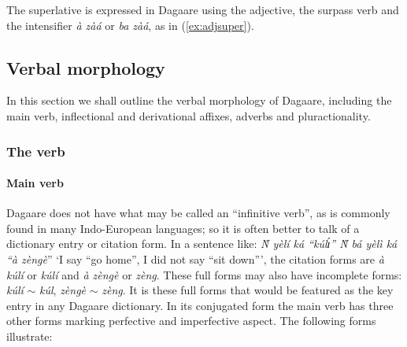 The superlative  is expressed in Dagaare using the adjective, the surpass verb and the
intensifier \textit{à zàá} or \textit{ba zàá}, as in (\ref{ex:adjsuper}).

\ea \label{ex:adjsuper}
\z\z 

\subsection{Verbal morphology}
In this section we shall outline the verbal morphology of Dagaare, including the main
verb, inflectional and derivational affixes, adverbs and pluractionality. 

\subsubsection{ The verb}
\paragraph{Main verb}
Dagaare does not have what may be called an ``infinitive verb'', as is commonly found
in many Indo-European languages; so it is often better to talk of a dictionary entry or citation
form. In a sentence like: \textit{Ǹ yèlí ká “kúlɪ́” Ǹ bá yèlì ká “à zèngè}” ‘I say “go home”, I did
not say “sit down”’, the citation forms are \textit{à kúlí} or \textit{kúlí} and   \textit{à zèngè} or \textit{zèng}. These full forms may also have incomplete forms: \textit{kúlí}  $\sim$ \textit{kúl}, \textit{zèngè}  $\sim$ \textit{zèng}. It is these full forms
that would be featured as the key entry in any Dagaare dictionary.
In its conjugated form the main verb has three other forms marking perfective and
imperfective aspect. The following forms illustrate:







